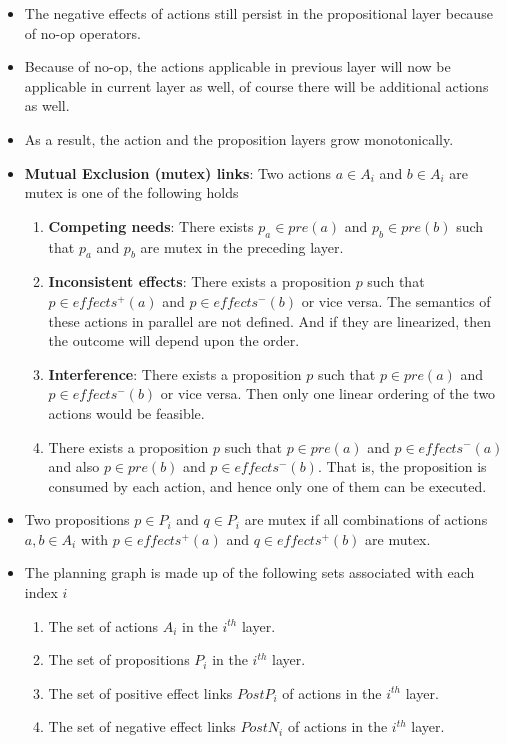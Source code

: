 \documentclass[a4paper]{article}
\begin{document}
\begin{itemize}
    \item The negative effects of actions still persist in the propositional layer because of no-op operators.
    \item Because of no-op, the actions applicable in previous layer will now be applicable in current layer as well, of course there will be additional actions as well.
    \item As a result, the action and the proposition layers grow monotonically.
    \item \textbf{Mutual Exclusion (mutex) links}: Two actions $a\in A_i$ and $b\in A_i$ are mutex is one of the following holds
    \begin{enumerate}
        \item \textbf{Competing needs}: There exists $p_a\in pre(a)$ and $p_b\in pre(b)$ such that $p_a$ and $p_b$ are mutex in the preceding layer.
        \item \textbf{Inconsistent effects}: There exists a proposition $p$ such that $p\in effects^+(a)$ and $p\in effects^-(b)$ or vice versa. The semantics of these actions in parallel are not defined. And if they are linearized, then the outcome will depend upon the order.
        \item \textbf{Interference}: There exists a proposition $p$ such that $p\in pre(a)$ and $p\in effects^-(b)$ or vice versa. Then only one linear ordering of the two actions would be feasible.
        \item There exists a proposition $p$ such that $p\in pre(a)$ and $p\in effects^-(a)$ and also $p\in pre(b)$ and $p\in effects^-(b)$. That is, the proposition is consumed by each action, and hence only one of them can be executed.
    \end{enumerate}
    \item Two propositions $p\in P_i$ and $q\in P_i$ are mutex if all combinations of actions $a,b\in A_i$ with $p\in effects^+(a)$ and $q\in effects^+(b)$ are mutex.
    \item The planning graph is made up of the following sets associated with each index $i$
    \begin{enumerate}
        \item The set of actions $A_i$ in the $i^{th}$ layer.
        \item The set of propositions $P_i$ in the $i^{th}$ layer.
        \item The set of positive effect links $PostP_i$ of actions in the $i^{th}$ layer.
        \item The set of negative effect links $PostN_i$ of actions in the $i^{th}$ layer.

\end{enumerate}
\end{itemize}
\end{document}
